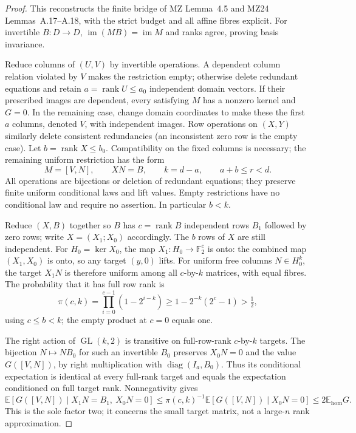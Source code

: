 \begin{proof}
This reconstructs the finite bridge of MZ Lemma~4.5 and MZ24
Lemmas~A.17--A.18, with the strict budget and all affine fibres explicit.
For invertible $B:D\to D$, $\operatorname{im}(MB)=\operatorname{im}M$
and ranks agree, proving basis invariance.

Reduce columns of $(U,V)$ by invertible operations. A dependent column
relation violated by $V$ makes the restriction empty; otherwise delete
redundant equations and retain $a=\operatorname{rank}U\le a_0$
independent domain vectors. If their prescribed images are dependent,
every satisfying $M$ has a nonzero kernel and $G=0$.
In the remaining case, change domain coordinates to make these the
first $a$ columns, denoted $V$, with independent images. Row operations
on $(X,Y)$ similarly delete consistent redundancies (an inconsistent
zero row is the empty case). Let $b=\operatorname{rank}X\le b_0$.
Compatibility on the fixed columns is necessary; the remaining
uniform restriction has the form
\[
 M=[V,N],\qquad XN=B,\qquad k=d-a,\qquad a+b\le r<d.
\]
All operations are bijections or deletion of redundant equations;
they preserve finite uniform conditional laws and lift values.
Empty restrictions have no conditional law and require no assertion.
In particular $b<k$.

Reduce $(X,B)$ together so $B$ has $c=\operatorname{rank}B$
independent rows $B_1$ followed by zero rows; write
$X=(X_1;X_0)$ accordingly. The $b$ rows of $X$ are still independent.
For $H_0=\ker X_0$, the map $X_1:H_0\to\mathbb F_2^c$ is onto:
the combined map $(X_1,X_0)$ is onto, so any target $(y,0)$ lifts.
For uniform free columns $N\in H_0^k$, the target $X_1N$ is therefore
uniform among all $c$-by-$k$ matrices, with equal fibres. The probability
that it has full row rank is
\[
 \pi(c,k)=\prod_{i=0}^{c-1}(1-2^{i-k})
 \ge1-2^{-k}(2^c-1)>\tfrac12,
\]
using $c\le b<k$; the empty product at $c=0$ equals one.

The right action of $\operatorname{GL}(k,2)$ is transitive on
full-row-rank $c$-by-$k$ targets. The bijection $N\mapsto NB_0$
for such an invertible $B_0$ preserves $X_0N=0$ and the value
$G([V,N])$, by right multiplication with $\operatorname{diag}(I_a,B_0)$.
Thus its conditional expectation is identical at every full-rank
target and equals the expectation conditioned on full target rank.
Nonnegativity gives
\[
 \mathbb E[G([V,N])\mid X_1N=B_1,\ X_0N=0]
 \le\pi(c,k)^{-1}\mathbb E[G([V,N])\mid X_0N=0]
 \le2\mathbb E_{\mathrm{hom}}G.
\]
This is the sole factor two; it concerns the small target matrix,
not a large-$n$ rank approximation.


\end{proof}
